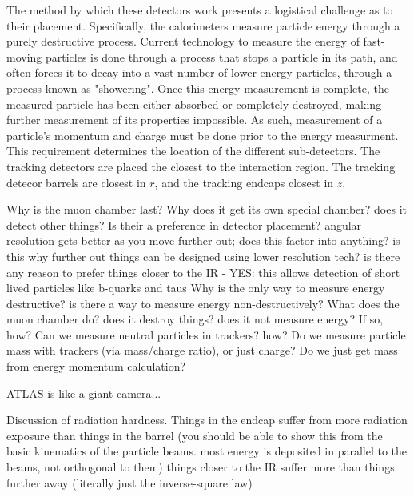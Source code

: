     The method by which these detectors work presents a logistical challenge as to their placement.
    Specifically, the calorimeters measure particle energy through a purely destructive process.
    Current technology to measure the energy of fast-moving particles is done through a process that stops a particle in its path, and often forces it to decay into a vast number of lower-energy particles, through a process known as "showering".
    Once this energy measurement is complete, the measured particle has been either absorbed or completely destroyed, making further measurement of its properties impossible.
    As such, measurement of a particle's momentum and charge must be done prior to the energy measurment. This requirement determines the location of the different sub-detectors.
    The tracking detectors are placed the closest to the interaction region. The tracking detecor barrels are closest in $r$,
    and the tracking endcaps closest in $z$.






        
    Why is the muon chamber last? Why does it get its own special chamber? does it detect other things?
    Is their a preference in detector placement? 
    angular resolution gets better as you move further out; does this factor into anything? is this why further out things can be designed using lower resolution tech?
    is there any reason to prefer things closer to the IR - YES: this allows detection of short lived particles like b-quarks and taus \cite{CERN-LHCC-97-016}
    Why is the only way to measure energy destructive? is there a way to measure energy non-destructively? What does the muon chamber do? does it destroy things? does it not measure energy? If so, how?
    Can we measure neutral particles in trackers? how? Do we measure particle mass with trackers (via mass/charge ratio), or just charge? Do we just get mass from energy momentum calculation?











    ATLAS is like a giant camera...



    Discussion of radiation hardness.
    Things in the endcap suffer from more radiation exposure than things in the barrel
        (you should be able to show this from the basic kinematics of the particle beams. most energy is deposited in parallel to the beams, not orthogonal to them)
    things closer to the IR suffer more than things further away (literally just the inverse-square law)

